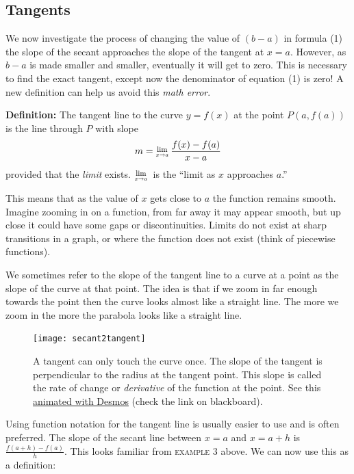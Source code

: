 \subsection*{Tangents}
We now investigate the process of changing the value of $(b -a)$ in formula (1) the slope of the secant approaches the slope of the tangent at $x =a$. However, as $b -a$ is made smaller and smaller, eventually it will get to zero. This is necessary to find the exact tangent, except now the denominator of equation (1) is zero! A new definition can help us avoid this \textit{math error}. 
\begin{tcolorbox}
\textbf{Definition:} The tangent line to the curve $y =f (x)$ at the point $P (a ,f (a))$ is the line through $P$ with slope \[m =\Lim{x\to a}\frac{f (x) -f (a)}{x -a}\] provided that the \textit{limit} exists. $\Lim{x\to a}$ is the ``limit as $x$ approaches $a$.''
\end{tcolorbox}
This means that as the value of $x$ gets close to $a$ the function remains smooth. Imagine zooming in on a function, from far away it may appear smooth, but up close it could have some gaps or discontinuities.  Limits do not exist at sharp transitions in a graph, or where the function does not exist (think of piecewise functions). 

We sometimes refer to the slope of the tangent line to a curve at a point as the slope of the curve at that point. The idea is that if we zoom in far enough towards the point then the curve looks almost like a straight line. The more we zoom in the more the parabola looks like a straight line. 

\begin{figure}\begin{center}
		\texttt{[image: secant2tangent]}
		\caption{A tangent can only touch the curve once. The slope of the tangent is perpendicular to the radius at the tangent point. This slope is called the rate of change or \textit{derivative} of the function at the point. See this \href{https://www.desmos.com/calculator/ialy1tknoo}{animated with Desmos} (check the link on blackboard).}\end{center}
\end{figure}

Using function notation for the tangent line is usually easier to use and is often preferred. The slope of the secant line between $x =a$ and $x =a +h$ is $\displaystyle \frac{f (a +h) -f (a)}{h}$. This looks familiar from \textsc{example} 3 above. We can now use this as a definition:

